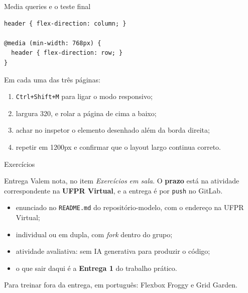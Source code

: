 \documentclass{beamer}
\begin{document}
\begin{frame}[fragile]{Media queries e o teste final}
	\begin{verbatim}
header { flex-direction: column; }

@media (min-width: 768px) {
  header { flex-direction: row; }
}
  \end{verbatim}

	\vspace{0.2cm}
	Em cada uma das três páginas:

	\begin{enumerate}
		\item \texttt{Ctrl+Shift+M} para ligar o modo responsivo;
		\item largura 320, e rolar a página de cima a baixo;
		\item achar no inspetor o elemento desenhado além da borda direita;
		\item repetir em 1200px e confirmar que o layout largo continua correto.
	\end{enumerate}
\end{frame}

\begin{frame}{Exercícios}
	\begin{block}{Entrega}
		Valem nota, no item \emph{Exercícios em sala}. O \textbf{prazo} está na
		atividade correspondente na \textbf{UFPR Virtual}, e a entrega é por
		\texttt{push} no GitLab.
	\end{block}

	\vspace{0.4cm}
	\begin{itemize}
		\item enunciado no \texttt{README.md} do repositório-modelo, com o endereço
		      na UFPR Virtual;
		\item individual ou em dupla, com \emph{fork} dentro do grupo;
		\item atividade avaliativa: sem IA generativa para produzir o código;
		\item o que sair daqui é a \textbf{Entrega 1} do trabalho prático.
	\end{itemize}

	\vspace{0.3cm}
	Para treinar fora da entrega, em português: Flexbox Froggy e Grid Garden.
\end{frame}
\end{document}
